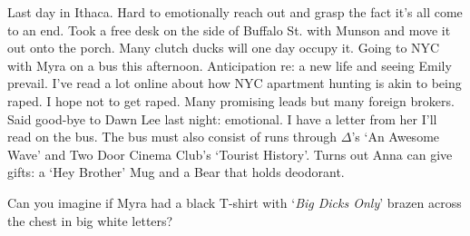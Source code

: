 Last day in Ithaca. Hard to emotionally reach out and grasp the fact it's all come to an end. Took a free desk on the side of Buffalo St. with Munson and move it out onto the porch. Many clutch ducks will one day occupy it. Going to NYC with Myra on a bus this afternoon. Anticipation re: a new life and seeing Emily prevail. I've read a lot online about how NYC apartment hunting is akin to being raped. I hope not to get raped. Many promising leads but many foreign brokers. Said good-bye to Dawn Lee last night: emotional. I have a letter from her I'll read on the bus. The bus must also consist of runs through $\Delta$'s `An Awesome Wave' and Two Door Cinema Club's `Tourist History'. Turns out Anna can give gifts: a `Hey Brother' Mug and a Bear that holds deodorant. 

Can you imagine if Myra had a black T-shirt with `\emph{Big Dicks Only}' brazen across the chest in big white letters?
